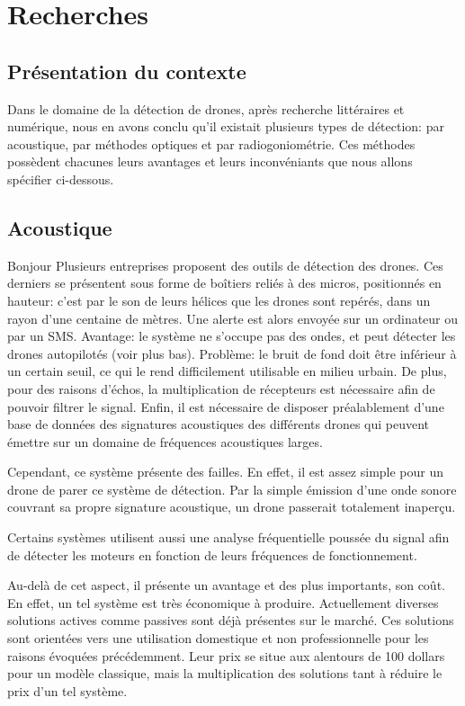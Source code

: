 
\chapter{Recherches}

\section{Présentation du contexte}

Dans le domaine de la détection de drones, après recherche littéraires et numérique, nous en avons conclu qu'il existait plusieurs types de détection: par acoustique, par méthodes optiques et par radiogoniométrie.
Ces méthodes possèdent chacunes leurs avantages et leurs inconvéniants que nous allons spécifier ci-dessous.


\section{Acoustique}

Bonjour
Plusieurs entreprises proposent des outils de détection des drones. Ces derniers se présentent sous forme de boîtiers reliés à des micros, positionnés en hauteur: c'est par le son de leurs hélices que les drones sont repérés, dans un rayon d'une centaine de mètres. Une alerte est alors envoyée sur un ordinateur ou par un SMS. Avantage: le système ne s'occupe pas des ondes, et peut détecter les drones autopilotés (voir plus bas). Problème: le bruit de fond doit être inférieur à un certain seuil, ce qui le rend difficilement utilisable en milieu urbain. De plus, pour des raisons d'échos, la multiplication de récepteurs est nécessaire afin de pouvoir filtrer le signal. Enfin, il est nécessaire de disposer préalablement d'une base de données des signatures acoustiques des différents drones qui peuvent émettre sur un domaine de fréquences acoustiques larges.

Cependant, ce système présente des failles. En effet, il est assez simple pour un drone de parer ce système de détection. Par la simple émission d'une onde sonore couvrant sa propre signature acoustique, un drone passerait totalement inaperçu.

Certains systèmes utilisent aussi une analyse fréquentielle poussée du signal afin de détecter les moteurs en fonction de leurs fréquences de fonctionnement.

Au-delà de cet aspect, il présente un avantage et des plus importants, son coût. En effet, un tel système est très économique à produire. Actuellement diverses solutions actives comme passives sont déjà présentes sur le marché. Ces solutions sont orientées vers une utilisation domestique et non professionnelle pour les raisons évoquées précédemment. Leur prix se situe aux alentours de 100 dollars pour un modèle classique, mais la multiplication des solutions tant à réduire le prix d'un tel système. 

